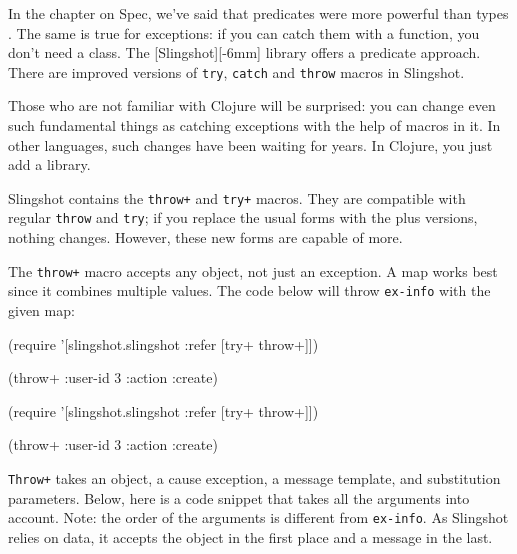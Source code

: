 
In the chapter on Spec, we've said that predicates were more powerful than types . The same is true for exceptions: if you can catch them with a function, you don't need a class. The [Slingshot][-6mm] library offers a predicate approach. There are improved versions of \verb|try|, \verb|catch| and \verb|throw| macros in Slingshot.


Those who are not familiar with Clojure will be surprised: you can change even such fundamental things as catching exceptions with the help of macros in it. In other languages, such changes have been waiting for years. In Clojure, you just add a library.


Slingshot contains the \verb|throw+| and \verb|try+| macros. They are compatible with regular \verb|throw| and \verb|try|; if you replace the usual forms with the plus versions, nothing changes. However, these new forms are capable of more.

The \verb|throw+| macro accepts any object, not just an exception. A map works best since it combines multiple values. The code below will throw \verb|ex-info| with the given map:

\ifnarrow

\begin{clojure}
(require
  '[slingshot.slingshot
    :refer [try+ throw+]])

(throw+ {:user-id 3 :action :create})
\end{clojure}

\else

\begin{clojure}
(require '[slingshot.slingshot :refer [try+ throw+]])

(throw+ {:user-id 3 :action :create})
\end{clojure}

\fi

\verb|Throw+| takes an object, a cause exception, a message template, and substitution parameters. Below, here is a code snippet that takes all the arguments into account. Note: the order of the arguments is different from \verb|ex-info|. As Slingshot relies on data, it accepts the object in the first place and a message in the last.

\ifnarrow

